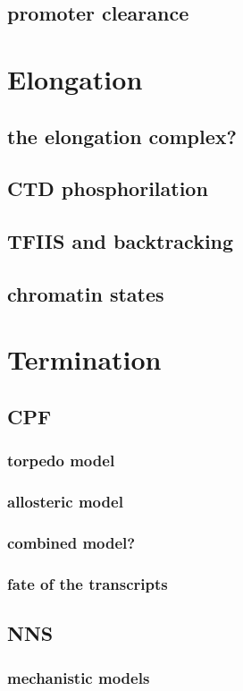 \subsection{promoter clearance}

\section{Elongation}
\subsection{the elongation complex?}
\subsection{CTD phosphorilation}
\subsection{TFIIS and backtracking}
\subsection{chromatin states}

\section{Termination}
\subsection{CPF}
\subsubsection{torpedo model}
\subsubsection{allosteric model}
\subsubsection{combined model?}
\subsubsection{fate of the transcripts}
\subsection{NNS}
\subsubsection{mechanistic models}
